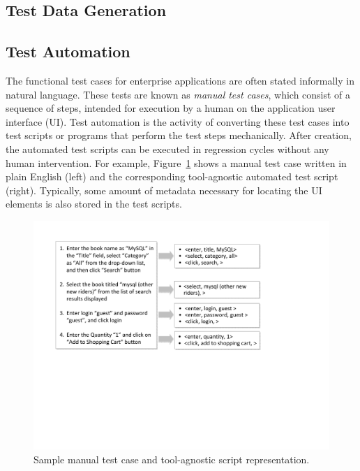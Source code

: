 \subsection{Test Data Generation}
\label{sec:test-data}



\subsection{Test Automation}
\label{sec:test-automation}

The functional test cases for enterprise applications are often stated
informally in natural language. These tests are known as \textit{manual test
  cases}, which consist of a sequence of steps, intended for execution by a
human on the application user interface (UI).  Test automation is the activity
of converting these test cases into test scripts or programs that perform the
test steps mechanically. After creation, the automated test scripts can be
executed in regression cycles without any human intervention. For example,
Figure~\ref{fig:sample-test-case} shows a manual test case written in plain
English (left) and the corresponding tool-agnostic automated test script
(right). Typically, some amount of metadata necessary for locating the UI
elements is also stored in the test scripts.

\begin{figure}[t]
\centering
\includegraphics[width=.95\columnwidth, clip, trim = 21mm 93mm 65mm
  18mm]{figs/sample-test-case.pdf}
\vspace*{-10pt}
\caption{Sample manual test case and tool-agnostic script representation.}
\vspace*{-13pt}
\label{fig:sample-test-case}
\end{figure}

